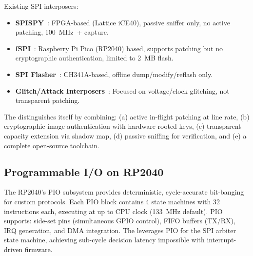 Existing \ac{SPI} interposers:
\begin{itemize}
    \item \textbf{SPISPY}~\cite{spispy}: FPGA-based (Lattice iCE40), passive sniffer only, no active patching, \SI{100}{MHz+} capture.
    \item \textbf{fSPI}~\cite{fspi}: Raspberry Pi Pico (RP2040) based, supports patching but no cryptographic authentication, limited to \SI{2}{MB} flash.
    \item \textbf{SPI Flasher}~\cite{spi-flasher}: CH341A-based, offline dump/modify/reflash only.
    \item \textbf{Glitch/Attack Interposers}~\cite{glitch-interposer}: Focused on voltage/clock glitching, not transparent patching.
\end{itemize}

The \vbfc distinguishes itself by combining: (a) active in-flight patching at line rate, (b) cryptographic image authentication with hardware-rooted keys, (c) transparent capacity extension via shadow map, (d) passive sniffing for verification, and (e) a complete open-source toolchain.

\subsection{Programmable I/O on RP2040}
The RP2040's \ac{PIO} subsystem provides deterministic, cycle-accurate bit-banging for custom protocols. Each \ac{PIO} block contains 4 state machines with 32 instructions each, executing at up to \ac{CPU} clock (\SI{133}{MHz} default). \ac{PIO} supports: side-set pins (simultaneous GPIO control), FIFO buffers (TX/RX), IRQ generation, and DMA integration. The \vbfc leverages \ac{PIO} for the \ac{SPI} arbiter state machine, achieving sub-cycle decision latency impossible with interrupt-driven firmware.